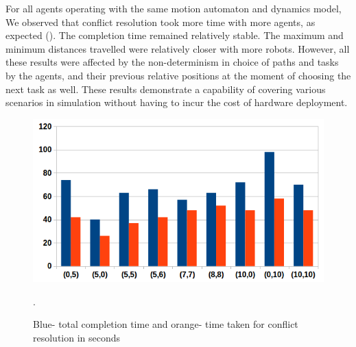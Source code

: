  For all agents operating with the same motion automaton and dynamics model, We observed that conflict resolution took more time with more agents, as expected (). The completion time remained relatively stable. The maximum and minimum distances travelled were relatively closer with more robots. However, all these results were affected by the non-determinism in choice of paths and tasks by the agents, and their previous relative positions at the moment of choosing the next task as well. These results demonstrate a capability of covering various scenarios in simulation without having to incur the cost of hardware deployment.  
 
\begin{figure}[h!]
\includegraphics[width=.5\textwidth]{figs/completion.png}\hfill
\caption{\small  Blue-  total completion time and orange- time taken for conflict resolution in seconds}. 
\label{fig:completionstats}
\end{figure}